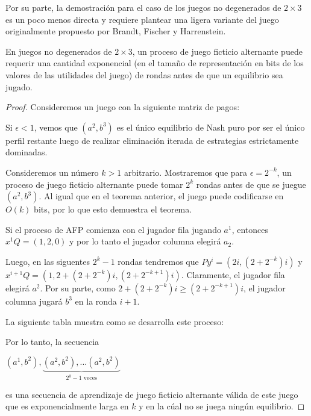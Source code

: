 Por su parte, la demostración para el caso de los juegos no degenerados de $2 \times 3$ es un poco menos directa y requiere plantear una ligera variante del juego originalmente propuesto por Brandt, Fischer y Harrenstein.

\begin{theorem}
    En juegos no degenerados de $2 \times 3$, un proceso de juego ficticio alternante puede requerir una cantidad exponencial (en el tamaño de representación en bits de los valores de las utilidades del juego) de rondas antes de que un equilibrio sea jugado.
\end{theorem}

\begin{proof}
    Consideremos un juego con la siguiente matriz de pagos:

    

    Si $\epsilon < 1$, vemos que $(a^2, b^3)$ es el único equilibrio de Nash puro
    por ser el único perfil restante luego de realizar eliminación iterada de estrategias estrictamente dominadas.

    Consideremos un número $k > 1$ arbitrario. Mostraremos que para $\epsilon = 2^{-k}$, un proceso de juego ficticio alternante puede tomar $2^k$ rondas antes de que se juegue $(a^2, b^3)$. Al igual que en el teorema anterior, el juego puede codificarse en $O(k)$ bits, por lo que esto demuestra el teorema.

    Si el proceso de AFP comienza con el jugador fila jugando $a^1$, entonces $x^1Q = (1, 2, 0)$ y por lo tanto el jugador columna elegirá $a_2$.

    Luego, en las siguentes $2^k - 1$ rondas tendremos que $Py^i = (2i, (2+2^{-k})i)$ y $x^{i+1}Q = (1, 2+(2+2^{-k})i, (2+2^{-k+1})i)$. Claramente, el jugador fila elegirá $a^2$. Por su parte, como $2+(2+2^{-k})i \ge (2+2^{-k+1})i$, el jugador columna jugará $b^3$ en la ronda $i + 1$.

    La siguiente tabla muestra como se desarrolla este proceso:

    

    Por lo tanto, la secuencia

    \begin{center}
    \begin{math}
        (a^1, b^2), \underbrace{(a^2, b^2), ... (a^2, b^2)}_{\text{$2^k - 1$ veces}}
    \end{math}
    \end{center}

    es una secuencia de aprendizaje de juego ficticio alternante válida de este juego que es exponencialmente larga en $k$ y en la cúal no se juega ningún equilibrio.

\end{proof}

